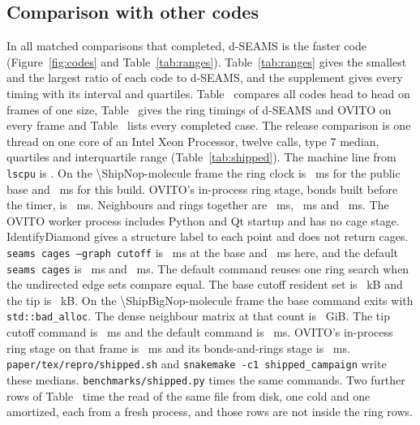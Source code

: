 \documentclass[preprint,12pt]{elsarticle}
\begin{document}
\subsection{Comparison with other codes}
\label{sec:codes}

In all  matched comparisons that completed, d-SEAMS is the faster code (Figure~\ref{fig:codes} and Table~\ref{tab:ranges}).
Table~\ref{tab:ranges} gives the smallest and the largest ratio of each code to d-SEAMS, and the supplement gives every timing with its interval and quartiles.
Table~ compares all codes head to head on frames of one size, Table~ gives the ring timings of d-SEAMS and OVITO on every frame and Table~ lists every completed case.
The release comparison is one thread on one core of an Intel Xeon Processor, twelve calls, type 7 median, quartiles and interquartile range (Table~\ref{tab:shipped}).
The machine line from \texttt{lscpu} is \ShipHost.
On the \num{\ShipNop}-molecule frame the ring clock is \ShipRingsBaseQ~ms for the public base and \ShipRingsTipQ~ms for this build.
OVITO's in-process ring stage, bonds built before the timer, is \ShipRingsOvitoQ~ms.
Neighbours and rings together are \ShipNeighBaseQ~ms, \ShipNeighTipQ~ms and \ShipNeighOvitoQ~ms.
The OVITO worker process includes Python and Qt startup and has no cage stage.
IdentifyDiamond gives a structure label to each point and does not return cages.
\texttt{seams cages --graph cutoff} is \ShipCutBaseQ~ms at the base and \ShipCutTipQ~ms here, and the default \texttt{seams cages} is \ShipSeedBaseQ~ms and \ShipSeedTipQ~ms.
The default command reuses one ring search when the undirected edge sets compare equal.
The base cutoff resident set is \ShipRssCutBase~kB and the tip is \ShipRssCutTip~kB.
On the \num{\ShipBigNop}-molecule frame the base command exits with \texttt{std::bad\_alloc}.
The dense neighbour matrix at that count is \ShipMatrixGib~GiB.
The tip cutoff command is \ShipBigCutTipQ~ms and the default command is \ShipBigSeedTipQ~ms.
OVITO's in-process ring stage on that frame is \ShipBigRingsOvitoQ~ms and its bonds-and-rings stage is \ShipBigBondsOvitoQ~ms.
\texttt{paper/tex/repro/shipped.sh} and \texttt{snakemake -c1 shipped\_campaign} write these medians.
\texttt{benchmarks/shipped.py} times the same commands.
Two further rows of Table~ time the read of the same file from disk, one cold and one amortized, each from a fresh process, and those rows are not inside the ring rows.
\end{document}
